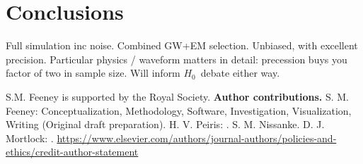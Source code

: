 \documentclass[%
 reprint,
 superscriptaddress,
 nofootinbib,
 amsmath,amssymb,
 aps,
]{revtex4-2}
\newcommand{\hubble}{\ensuremath{H_0}}
\begin{document}
\section{Conclusions} \label{sec:conclusions}
Full simulation inc noise. Combined GW+EM selection. Unbiased, with excellent precision. Particular physics / waveform matters in detail: precession buys you factor of two in sample size. Will inform \hubble\ debate either way.


\begin{acknowledgments}
S.M. Feeney is supported by the Royal Society.
{\bf Author contributions.} S. M. Feeney: Conceptualization, Methodology, Software, Investigation, Visualization, Writing (Original draft preparation). H. V. Peiris: . S. M. Nissanke. D. J. Mortlock: . \url{https://www.elsevier.com/authors/journal-authors/policies-and-ethics/credit-author-statement}
\end{acknowledgments}


\end{document}
